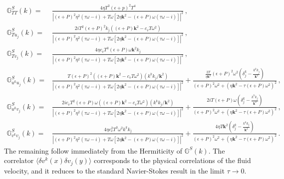 \documentclass[a4paper, amsfonts, amssymb, amsmath, reprint, showkeys, nofootinbib, twoside,notitlepage,onecolumn]{revtex4-2}
\newcommand{\Ga}{{\mathbb{G}}}
\theoremstyle{definition}
\begin{document}
\begin{equation}
\begin{split}
    \Ga^S_{TT}(k) ={}& \frac{4 \eta T^3 (\epsilon + p)^2 T^4}{|(\epsilon + P)^2 \eta^2 (\tau \omega - i) + T \omega \left[ 2 \eta \textbf{k}^2 - (\epsilon + P) \omega (\tau \omega - i) \right]|^2} \, , \\
    \Ga^S_{Tu_j}(k) ={}& \frac{2 i T^2 (\epsilon + P)^2 k_j \left( (\epsilon + P) \textbf{k}^2 - c_v T \omega^2 \right)}{|(\epsilon + P)^2 \eta^2 (\tau \omega - i) + T \omega \left[ 2 \eta \textbf{k}^2 - (\epsilon + P) \omega (\tau \omega - i) \right]|^2} \, , \\
    \Ga^S_{Tv_j}(k) ={}& \frac{4 \eta c_v T^3 (\epsilon + P) \omega \textbf{k}^2 k_j}{|(\epsilon + P)^2 \eta^2 (\tau \omega - i) + T \omega \left[ 2 \eta \textbf{k}^2 - (\epsilon + P) \omega (\tau \omega - i) \right]|^2} \, , \\
    \Ga^S_{u^k u_j}(k) ={}& \frac{T (\epsilon + P)^2 \left( (\epsilon + P) \textbf{k}^2 - c_v T \omega^2 \right) \left( k^k k_j / \textbf{k}^2 \right)}{|(\epsilon + P)^2 \eta^2 (\tau \omega - i) + T \omega \left[ 2 \eta \textbf{k}^2 - (\epsilon + P) \omega (\tau \omega - i) \right]|^2} + \frac{\frac{2T}{\eta \textbf{k}^2} (\epsilon + P)^2 \omega^2 \left( \delta^k_j - \frac{k^k k_j}{\textbf{k}^2} \right)}{(\epsilon + P)^2 \omega^2 + \left( \eta \textbf{k}^2 - \tau (\epsilon + P) \omega^2 \right)^2} \, , \\
    \Ga^S_{u^k v_j}(k) ={}& \frac{2 i c_v T^2 (\epsilon + P) \omega \left( (\epsilon + P) \textbf{k}^2 - c_v T \omega^2 \right) \left( k^k k_j / \textbf{k}^2 \right)}{|(\epsilon + P)^2 \eta^2 (\tau \omega - i) + T \omega \left[ 2 \eta \textbf{k}^2 - (\epsilon + P) \omega (\tau \omega - i) \right]|^2} + \frac{2iT (\epsilon + P) \omega \left( \delta^k_j - \frac{k^k k_j}{\textbf{k}^2} \right)}{(\epsilon + P)^2 \omega^2 + \left( \eta \textbf{k}^2 - \tau (\epsilon + P) \omega^2 \right)^2} \, , \\
    \Ga^S_{v^k v_j}(k) ={}& \frac{4 \eta c_v^2 T^3 \omega^2 k^k k_j}{|(\epsilon + P)^2 \eta^2 (\tau \omega - i) + T \omega \left[ 2 \eta \textbf{k}^2 - (\epsilon + P) \omega (\tau \omega - i) \right]|^2} + \frac{4\eta T \textbf{k}^2 \left( \delta^k_j - \frac{k^k k_j}{\textbf{k}^2} \right)}{(\epsilon + P)^2 \omega^2 + \left( \eta \textbf{k}^2 - \tau (\epsilon + P) \omega^2 \right)^2} \, .
\end{split}
\end{equation}
The remaining follow immediately from the Hermiticity of $\Ga^S(k)$.
The correlator $\langle \delta v^k(x) \delta v_j(y) \rangle$
corresponds to the physical correlations of the fluid velocity, and it reduces to the standard Navier-Stokes result in the limit $\tau \rightarrow 0$. 
\end{document}
